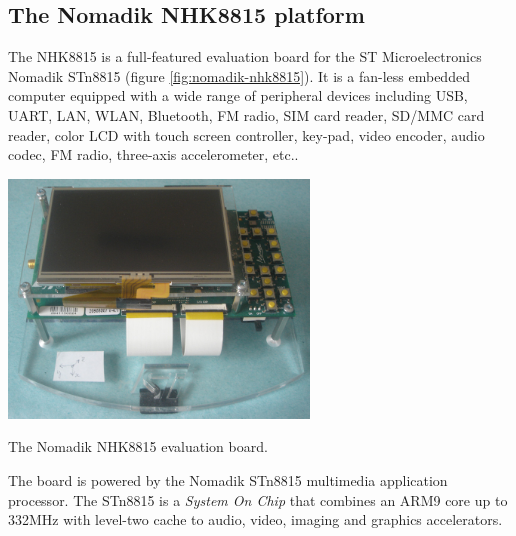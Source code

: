 \documentclass[a4paper,10pt]{article}
\makeatletter
\newenvironment{figurehere}{\def\@captype{figure}\vspace{2ex}}{\vspace{2ex}}
\makeatother
\begin{document}
\begin{multicols}{2}
\subsection{The Nomadik NHK8815 platform}
\label{sec:nomadik_nhk8815_platform}
The NHK8815 is a full-featured evaluation board for the ST Microelectronics
Nomadik STn8815 (figure \ref{fig:nomadik-nhk8815}). It is a fan-less embedded
computer equipped with a wide range of peripheral devices including USB, UART,
LAN, WLAN, Bluetooth, FM radio, SIM card reader, SD/MMC card reader, color LCD
with touch screen controller, key-pad, video encoder, audio codec, FM radio,
three-axis accelerometer, etc..

\begin{figurehere}
 \centering
 \includegraphics[width=8cm, height=6.35cm]{./figures/nomadik-nhk8815.jpg}
 \caption{The Nomadik NHK8815 evaluation board.}
 \label{fig:nomadik-nhk8815}
\end{figurehere}

The board is powered by the Nomadik STn8815 multimedia application processor.
The STn8815 is a \emph{System On Chip} that combines an ARM9 core up to 332MHz
with level-two cache to audio, video, imaging and graphics accelerators.





\end{multicols}
\end{document}
